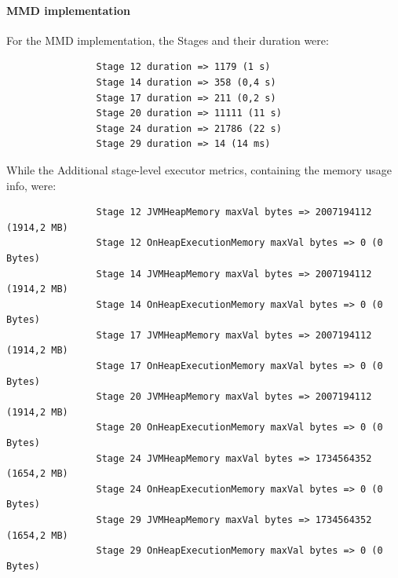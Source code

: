\documentclass[a4paper,11pt, twoside]{article}
\begin{document}
            \paragraph{MMD implementation}
            For the MMD implementation, the Stages and their duration were:
            \begin{verbatim}
                Stage 12 duration => 1179 (1 s)
                Stage 14 duration => 358 (0,4 s)
                Stage 17 duration => 211 (0,2 s)
                Stage 20 duration => 11111 (11 s)
                Stage 24 duration => 21786 (22 s)
                Stage 29 duration => 14 (14 ms)
            \end{verbatim}
            \bigskip
            While the Additional stage-level executor metrics, containing the memory usage info, were:
            \begin{verbatim}
                Stage 12 JVMHeapMemory maxVal bytes => 2007194112 (1914,2 MB)
                Stage 12 OnHeapExecutionMemory maxVal bytes => 0 (0 Bytes)
                Stage 14 JVMHeapMemory maxVal bytes => 2007194112 (1914,2 MB)
                Stage 14 OnHeapExecutionMemory maxVal bytes => 0 (0 Bytes)
                Stage 17 JVMHeapMemory maxVal bytes => 2007194112 (1914,2 MB)
                Stage 17 OnHeapExecutionMemory maxVal bytes => 0 (0 Bytes)
                Stage 20 JVMHeapMemory maxVal bytes => 2007194112 (1914,2 MB)
                Stage 20 OnHeapExecutionMemory maxVal bytes => 0 (0 Bytes)
                Stage 24 JVMHeapMemory maxVal bytes => 1734564352 (1654,2 MB)
                Stage 24 OnHeapExecutionMemory maxVal bytes => 0 (0 Bytes)
                Stage 29 JVMHeapMemory maxVal bytes => 1734564352 (1654,2 MB)
                Stage 29 OnHeapExecutionMemory maxVal bytes => 0 (0 Bytes)
            \end{verbatim}
        
\end{document}
